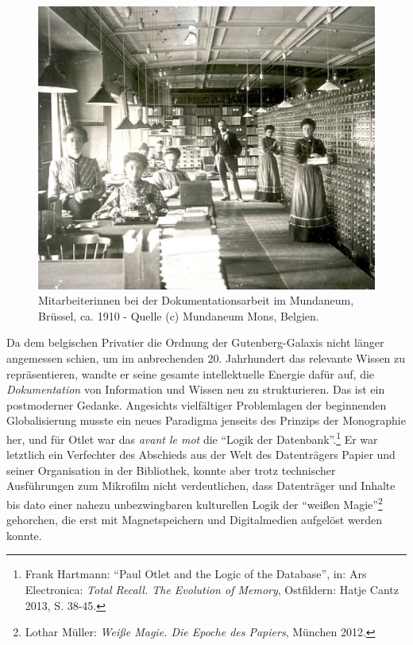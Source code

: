 \begin{figure}[htbp]
\centering
\includegraphics{img/Mundaneum1.png}
\caption*{Mitarbeiterinnen bei der Dokumentationsarbeit im Mundaneum,
Brüssel, ca. 1910 - Quelle (c) Mundaneum Mons, Belgien.}
\end{figure}

Da dem belgischen Privatier die Ordnung der Gutenberg-Galaxis nicht
länger angemessen schien, um im anbrechenden 20. Jahrhundert das
relevante Wissen zu repräsentieren, wandte er seine gesamte
intellektuelle Energie dafür auf, die \emph{Dokumentation} von
Information und Wissen neu zu strukturieren. Das ist ein postmoderner
Gedanke. Angesichts vielfältiger Problemlagen der beginnenden
Globalisierung musste ein neues Paradigma jenseits des Prinzips der
Monographie her, und für Otlet war das \emph{avant le mot} die
\enquote{Logik der Datenbank}.\footnote{Frank Hartmann: \enquote{Paul
  Otlet and the Logic of the Database}, in: Ars Electronica: \emph{Total
  Recall. The Evolution of Memory}, Ostfildern: Hatje Cantz 2013, S.
  38-45.} Er war letztlich ein Verfechter des Abschieds aus der Welt des
Datenträgers Papier und seiner Organisation in der Bibliothek, konnte
aber trotz technischer Ausführungen zum Mikrofilm nicht verdeutlichen,
dass Datenträger und Inhalte bis dato einer nahezu unbezwingbaren
kulturellen Logik der \enquote{weißen Magie}\footnote{Lothar Müller:
  \emph{Weiße Magie. Die Epoche des Papiers}, München 2012.} gehorchen,
die erst mit Magnetspeichern und Digitalmedien aufgelöst werden konnte.

